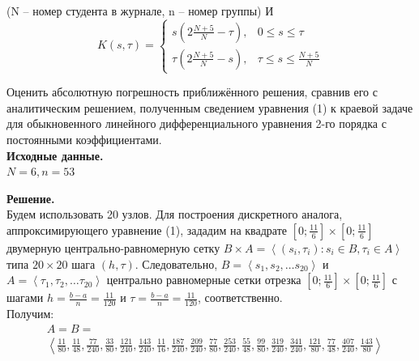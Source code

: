 \documentclass[14pt,a4paper]{scrartcl}
\begin{document}
(N -- номер студента в журнале, n -- номер группы)
И
\begin{equation*}
	K(s, \tau)=\left\{\begin{array}{ll}{s\left(2 \frac{N+5}{N}-\tau\right),} & {0 \leq s \leq \tau} \\ {\tau\left(2 \frac{N+5}{N}-s\right),} & {\tau \leq s \leq \frac{N+5}{N}}\end{array}\right.
\end{equation*}

Оценить абсолютную погрешность приближённого решения, сравнив его с аналитическим решением, полученным сведением уравнения (1) к краевой
задаче для обыкновенного линейного дифференциального уравнения 2-го порядка с постоянными коэффициентами.\\

\textbf{Исходные данные.}\\
$N = 6, n = 53$


\textbf{Решение.}\\
Будем использовать 20 узлов. Для построения дискретного аналога, аппроксимирующего уравнение (1), зададим на квадрате $[0; \frac{11}{6}]\times[0;\frac{11}{6}]$ двумерную центрально-равномерную сетку $B \times A=\left\langle\left(s_{i}, \tau_{i}\right): s_{i} \in B, \tau_{i} \in A\right\rangle$ типа $20 \times 20$ шага $(h, \tau)$. Следовательно,  $B =\left\langle s_1, s_2, \ldots s_{20}\right\rangle$ и $A =\left\langle \tau_1, \tau_2, \ldots \tau_{20}\right\rangle$ центрально равномерные сетки отрезка $[0;\frac{11}{6}]\times[0;\frac{11}{6}]$ с шагами $h = \frac{b-a}{n} = \frac{11}{120}$ и $\tau = \frac{b-a}{n} = \frac{11}{120}$, соответственно.\\
Получим:
\begin{align*}
	&A = B = \\
	& \left\langle
	{\frac{11}{80}},
	{\frac{11}{48}},
	{\frac{77}{240}},
	{\frac{33}{80}},
	{\frac{121}{240}},
	{\frac{143}{240}},
	{\frac{11}{16}},
	{\frac{187}{240}},
	{\frac{209}{240}},
	{\frac{77}{80}},
	{\frac{253}{240}},
	{\frac{55}{48}},
	{\frac{99}{80}},
	{\frac{319}{240}},
	{\frac{341}{240}},
	{\frac{121}{80}},
	{\frac{77}{48}},
	{\frac{407}{240}},
	{\frac{143}{80}}\right\rangle
\end{align*}
\end{document}
